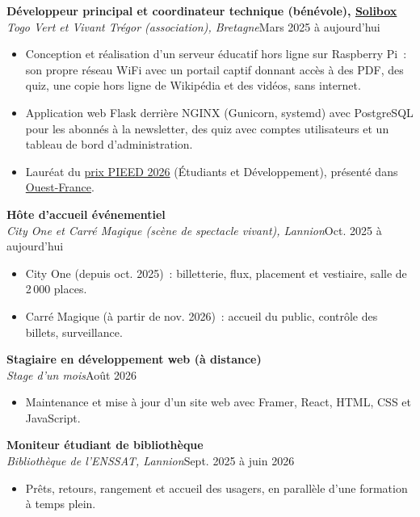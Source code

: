 \documentclass[10pt,a4paper]{article}
\newcommand{\entry}[3]{%
  \par\addvspace{6pt}%
  \noindent\textbf{#1}\\
  \textit{#2}\hfill #3\par
}
\newcommand{\project}[2]{\href{https://masterkpg.github.io/\#project-#1}{#2}}
\begin{document}
\entry{Développeur principal et coordinateur technique (bénévole), \project{solibox}{Solibox}}{Togo Vert et Vivant Trégor (association), Bretagne}{Mars 2025 à aujourd'hui}
\begin{itemize}
  \item Conception et réalisation d'un serveur éducatif hors ligne sur Raspberry Pi~: son propre
        réseau WiFi avec un portail captif donnant accès à des PDF, des quiz, une copie hors ligne
        de Wikipédia et des vidéos, sans internet.
  \item Application web Flask derrière NGINX (Gunicorn, systemd) avec PostgreSQL pour les abonnés à
        la newsletter, des quiz avec comptes utilisateurs et un tableau de bord d'administration.
  \item Lauréat du \href{https://pieed.wordpress.com/category/editions-du-pieed/pieed-2026/}{prix PIEED
        2026} (Étudiants et Développement), présenté dans
        \href{https://www.ouest-france.fr/associations/quel-est-limpact-de-votre-telephone-cette-association-bretonne-le-montre-grace-a-solibox-sa-mallette-pedagogique-d03753e6-b826-11f1-ad16-43b274a58389}{Ouest-France}.
\end{itemize}

\entry{Hôte d'accueil événementiel}{City One et Carré Magique (scène de spectacle vivant), Lannion}{Oct. 2025 à aujourd'hui}
\begin{itemize}
  \item City One (depuis oct. 2025)~: billetterie, flux, placement et vestiaire, salle de
        2\,000 places.
  \item Carré Magique (à partir de nov. 2026)~: accueil du public, contrôle des billets, surveillance.
\end{itemize}

\entry{Stagiaire en développement web (à distance)}{Stage d'un mois}{Août 2026}
\begin{itemize}
  \item Maintenance et mise à jour d'un site web avec Framer, React, HTML, CSS et JavaScript.
\end{itemize}

\entry{Moniteur étudiant de bibliothèque}{Bibliothèque de l'ENSSAT, Lannion}{Sept. 2025 à juin 2026}
\begin{itemize}
  \item Prêts, retours, rangement et accueil des usagers, en parallèle d'une formation à temps plein.
\end{itemize}
\end{document}
